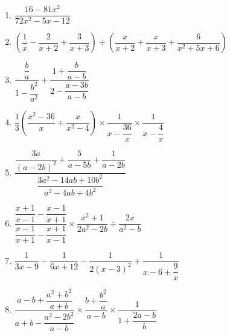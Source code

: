 \documentclass{article}
\begin{document}
\begin{enumerate}[label=\bfseries\small 140.\arabic*, itemsep=4cm]
\item $\dfrac{16-81x^2}{72x^2-5x-12}$

\item $\left( \dfrac{1}{x} - \dfrac{2}{x+2} + \dfrac{3}{x+3} \right) \div \left( \dfrac{x}{x+2} + \dfrac{x}{x+3} + \dfrac{6}{x^2+5x+6} \right)$

\item $\dfrac{\dfrac{b}{a}}{1 - \dfrac{b^2}{a^2}} + \dfrac{1 + \dfrac{b}{a - b}}{2 - \dfrac{a - 3b}{a - b}}$

\item $\dfrac{1}{3} \left( \dfrac{x^2 - 36}{x} \div \dfrac{x}{x^2 - 4} \right) \times \dfrac{1}{x - \dfrac{36}{x}} \times \dfrac{1}{x - \dfrac{4}{x}}$

\item $\dfrac{\dfrac{3a}{(a - 2b)^2} + \dfrac{5}{a - 5b} + \dfrac{1}{a - 2b}}{\dfrac{3a^2 - 14ab + 10b^2}{a^2 - 4ab + 4b^2}}$ 

\item $\dfrac{\dfrac{x+1}{x-1} - \dfrac{x-1}{x+1}}{\dfrac{x-1}{x+1} - \dfrac{x+1}{x-1}} \times \dfrac{x^2+1}{2a^2-2b} \div \dfrac{2x}{a^2-b}$

\item $  \dfrac{1}{3x-9} - \dfrac{1}{6x+12} - \dfrac{1}{2(x-3)^2} + \dfrac{1}{x-6+\dfrac{9}{x}}$

\item $\dfrac{a-b+\dfrac{a^2+b^2}{a+b}}{a+b-\dfrac{a^2-2b^2}{a-b}} \times \dfrac{b+\dfrac{b^2}{a}}{a-b} \times \dfrac{1}{1+\dfrac{2a-b}{b}}$



\end{enumerate}
\end{document}
